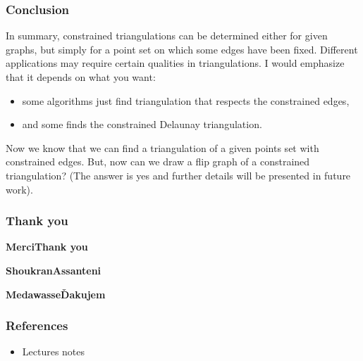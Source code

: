 \documentclass[10pt]{beamer}
\begin{document}
\begin{frame}
	\frametitle{Conclusion}
	In summary, constrained triangulations can be determined either for given graphs, but simply for a point set on which some edges have been fixed. Different applications may require certain qualities in triangulations. I would emphasize that it depends on what you want:\begin{itemize}
		\item some algorithms just find triangulation that respects the constrained edges, 
		\item and some finds the constrained Delaunay triangulation.
	\end{itemize}  Now we know that we can find a triangulation of a given points set with constrained edges. But, now can we draw a flip graph of a constrained triangulation? (The answer is yes and further details will be presented in future work).
\end{frame}
\begin{frame}
	\frametitle{Thank you}
	\begin{center}
		\begin{LARGE}
		\textbf{\color{blue}Merci}\hfill\textbf{\color{magenta}Thank you}
			\vspace{1.7cm}
			
			
			
			
		\textbf{\color{olive}Shoukran}\hfill	\textbf{\color{cyan}Assanteni}
			\vspace{1.7cm}
			
		
			
			
			\textbf{\color{red}Medawasse}\hfill\textbf{\color{purple}\v{D}akujem}
			
			
			
		\end{LARGE}
	\end{center}
\end{frame}
\begin{frame}
	\frametitle{References}\scriptsize
	\begin{itemize}
		\item Lectures notes
		\nocite{*}
		
		
	\end{itemize}
\end{frame}
\end{document}
